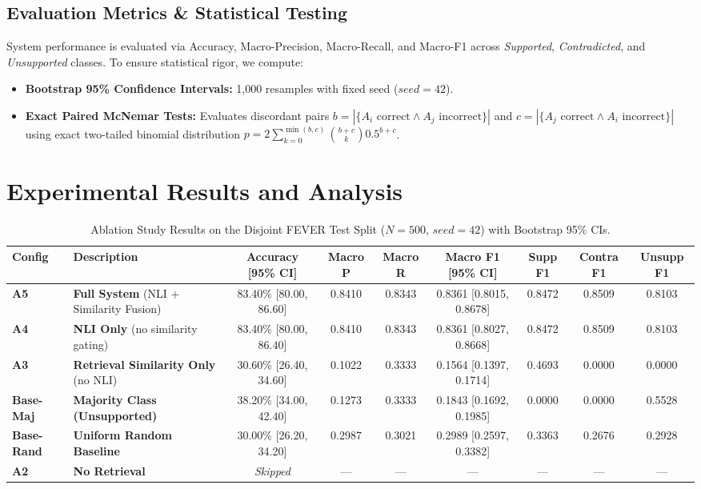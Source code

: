 \documentclass[conference]{IEEEtran}
\begin{document}
\subsection{Evaluation Metrics \& Statistical Testing}
System performance is evaluated via Accuracy, Macro-Precision, Macro-Recall, and Macro-F1 across \textit{Supported}, \textit{Contradicted}, and \textit{Unsupported} classes. To ensure statistical rigor, we compute:
\begin{itemize}
    \item \textbf{Bootstrap 95\% Confidence Intervals:} 1,000 resamples with fixed seed ($seed=42$).
    \item \textbf{Exact Paired McNemar Tests:} Evaluates discordant pairs $b = |\{A_i \text{ correct} \land A_j \text{ incorrect}\}|$ and $c = |\{A_j \text{ correct} \land A_i \text{ incorrect}\}|$ using exact two-tailed binomial distribution $p = 2 \sum_{k=0}^{\min(b,c)} \binom{b+c}{k} 0.5^{b+c}$.
\end{itemize}

\section{Experimental Results and Analysis}

\begin{table}[t]
\centering
\caption{Ablation Study Results on the Disjoint FEVER Test Split ($N=500$, $seed=42$) with Bootstrap 95\% CIs.}
\label{tab:fever_ablations}
\begin{tabular}{llccccccc}
\toprule
\textbf{Config} & \textbf{Description} & \textbf{Accuracy [95\% CI]} & \textbf{Macro P} & \textbf{Macro R} & \textbf{Macro F1 [95\% CI]} & \textbf{Supp F1} & \textbf{Contra F1} & \textbf{Unsupp F1} \\
\midrule
\textbf{A5} & \textbf{Full System} (NLI + Similarity Fusion) & 83.40\% [80.00, 86.60] & 0.8410 & 0.8343 & 0.8361 [0.8015, 0.8678] & 0.8472 & 0.8509 & 0.8103 \\
\textbf{A4} & \textbf{NLI Only} (no similarity gating) & 83.40\% [80.00, 86.40] & 0.8410 & 0.8343 & 0.8361 [0.8027, 0.8668] & 0.8472 & 0.8509 & 0.8103 \\
\textbf{A3} & \textbf{Retrieval Similarity Only} (no NLI) & 30.60\% [26.40, 34.60] & 0.1022 & 0.3333 & 0.1564 [0.1397, 0.1714] & 0.4693 & 0.0000 & 0.0000 \\
\textbf{Base-Maj} & \textbf{Majority Class (Unsupported)} & 38.20\% [34.00, 42.40] & 0.1273 & 0.3333 & 0.1843 [0.1692, 0.1985] & 0.0000 & 0.0000 & 0.5528 \\
\textbf{Base-Rand} & \textbf{Uniform Random Baseline} & 30.00\% [26.20, 34.20] & 0.2987 & 0.3021 & 0.2989 [0.2597, 0.3382] & 0.3363 & 0.2676 & 0.2928 \\
\textbf{A2} & \textbf{No Retrieval} & \textit{Skipped} & --- & --- & --- & --- & --- & --- \\
\bottomrule
\end{tabular}
\end{table}
\end{document}

